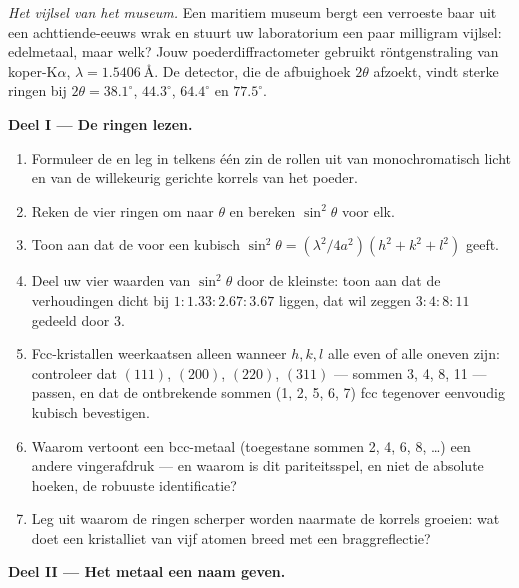 \begin{problem}\label{pb:b3:crystalline-solids:1}
\emph{Het vijlsel van het museum.} Een maritiem museum bergt een verroeste
baar uit een achttiende-eeuws wrak en stuurt uw laboratorium een
paar milligram vijlsel: edelmetaal, maar welk? Jouw
poederdiffractometer gebruikt röntgenstraling van koper-K$\alpha$,
$\lambda = \qty{1.5406}{\angstrom}$. De detector, die de
afbuighoek $2\theta$ afzoekt, vindt sterke ringen bij $2\theta =
38.1^\circ$, $44.3^\circ$, $64.4^\circ$ en $77.5^\circ$.

\medskip\noindent\textbf{Deel I --- De ringen lezen.}

\begin{enumerate}
  \item Formuleer de  en leg in telkens één zin de
        rollen uit van monochromatisch licht en van de willekeurig
        gerichte korrels van het poeder.
  \item Reken de vier ringen om naar $\theta$ en bereken
        $\sin^2\theta$ voor elk.
  \item Toon aan dat de  voor een kubisch 
        $\sin^2\theta = (\lambda^2/4a^2)(h^2 + k^2 + l^2)$ geeft.
  \item Deel uw vier waarden van $\sin^2\theta$ door de kleinste:
        toon aan dat de verhoudingen dicht bij $1 : 1.33 : 2.67 : 3.67$ liggen,
        dat wil zeggen $3 : 4 : 8 : 11$ gedeeld door 3.
  \item Fcc-kristallen weerkaatsen alleen wanneer $h, k, l$ alle even of
        alle oneven zijn: controleer dat $(111)$, $(200)$, $(220)$, $(311)$ ---
        sommen 3, 4, 8, 11 --- passen, en dat de ontbrekende sommen
        (1, 2, 5, 6, 7) fcc tegenover eenvoudig kubisch bevestigen.
  \item Waarom vertoont een bcc-metaal (toegestane sommen 2, 4, 6, 8, \dots)
        een andere vingerafdruk --- en waarom is dit pariteitsspel,
        en niet de absolute hoeken, de robuuste identificatie?
  \item Leg uit waarom de ringen scherper worden naarmate de korrels groeien: wat doet een
        kristalliet van vijf atomen breed met een braggreflectie?
\end{enumerate}

\medskip\noindent\textbf{Deel II --- Het metaal een naam geven.}


\end{problem}
